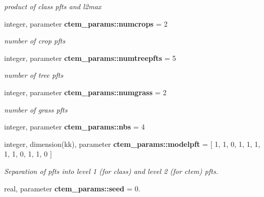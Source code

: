 \begin{DoxyCompactItemize}
\begin{DoxyCompactList}\small\item\em product of class pfts and l2max \end{DoxyCompactList}\item 
\hypertarget{namespacectem__params_a1da046f9e7bb1278e10a863dbfbda257}{}integer, parameter {\bfseries ctem\+\_\+params\+::numcrops} = 2\label{namespacectem__params_a1da046f9e7bb1278e10a863dbfbda257}

\begin{DoxyCompactList}\small\item\em number of crop pfts \end{DoxyCompactList}\item 
\hypertarget{namespacectem__params_a1bb0806116d93022aebdb7c5662a6375}{}integer, parameter {\bfseries ctem\+\_\+params\+::numtreepfts} = 5\label{namespacectem__params_a1bb0806116d93022aebdb7c5662a6375}

\begin{DoxyCompactList}\small\item\em number of tree pfts \end{DoxyCompactList}\item 
\hypertarget{namespacectem__params_aa48f481d72edc2d4d252c1fac748fabb}{}integer, parameter {\bfseries ctem\+\_\+params\+::numgrass} = 2\label{namespacectem__params_aa48f481d72edc2d4d252c1fac748fabb}

\begin{DoxyCompactList}\small\item\em number of grass pfts \end{DoxyCompactList}\item 
\hypertarget{namespacectem__params_a1e8ba7b501ad6afcb7260b6b4711ae86}{}integer, parameter {\bfseries ctem\+\_\+params\+::nbs} = 4\label{namespacectem__params_a1e8ba7b501ad6afcb7260b6b4711ae86}

\item 
\hypertarget{namespacectem__params_af53120baccb346b1743b085b6b254026}{}integer, dimension(kk), parameter {\bfseries ctem\+\_\+params\+::modelpft} = \mbox{[} 1, 1, 0, 1, 1, 1, 1, 1, 0, 1, 1, 0 \mbox{]}\label{namespacectem__params_af53120baccb346b1743b085b6b254026}

\begin{DoxyCompactList}\small\item\em Separation of pfts into level 1 (for class) and level 2 (for ctem) pfts. \end{DoxyCompactList}\item 
\hypertarget{namespacectem__params_ac9f4780ce317911fbf6daa45a90a8dad}{}real, parameter {\bfseries ctem\+\_\+params\+::seed} = 0.\label{namespacectem__params_ac9f4780ce317911fbf6daa45a90a8dad}


\end{DoxyCompactItemize}
